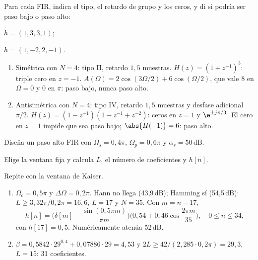 \documentclass[11pt,a4paper]{scrartcl}
\begin{document}
\begin{ejercicio}
  Para cada FIR, indica el tipo, el retardo de grupo y los ceros, y di si podría ser paso bajo o paso alto:
  \begin{incisos}[2]
    \item $h=(1,3,3,1)$;
    \item $h=(1,-2,2,-1)$.
  \end{incisos}
\end{ejercicio}
\begin{solucion}
  \begin{enumerate}[label=\alph*)]
    \item Simétrica con $N=4$: tipo II, retardo $1{,}5$ muestras. $H(z)=(1+z^{-1})^3$: triple cero en $z=-1$. $A(\Omega)=2\cos(3\Omega/2)+6\cos(\Omega/2)$, que vale 8 en $\Omega=0$ y 0 en $\pi$: paso bajo, nunca paso alto.
    \item Antisimétrica con $N=4$: tipo IV, retardo $1{,}5$ muestras y desfase adicional $\pi/2$. $H(z)=(1-z^{-1})(1-z^{-1}+z^{-2})$: ceros en $z=1$ y $\e^{\pm j\pi/3}$. El cero en $z=1$ impide que sea paso bajo; $\abs{H(-1)}=6$: paso alto.
  \end{enumerate}
\end{solucion}

\begin{ejercicio}
  Diseña un paso alto FIR con $\Omega_s=0{,}4\pi$, $\Omega_p=0{,}6\pi$ y $\alpha_s=50$\,dB.
  \begin{incisos}[1]
    \item Elige la ventana fija y calcula $L$, el número de coeficientes y $h[n]$.
    \item Repite con la ventana de Kaiser.
  \end{incisos}
\end{ejercicio}
\begin{solucion}
  \begin{enumerate}[label=\alph*)]
    \item $\Omega_c=0{,}5\pi$ y $\Delta\Omega=0{,}2\pi$. Hann no llega (43,9\,dB); Hamming sí (54,5\,dB): $L\ge3{,}32\pi/0{,}2\pi=16{,}6$, $L=17$ y $N=35$. Con $m=n-17$,
    \[
      h[n]=\Big(\delta[m]-\frac{\sin(0{,}5\pi m)}{\pi m}\Big)\Big(0{,}54+0{,}46\cos\frac{2\pi m}{35}\Big),\quad 0\le n\le34,
    \]
    con $h[17]=0{,}5$. Numéricamente atenúa 52\,dB.
    \item $\beta=0{,}5842\cdot29^{0,4}+0{,}07886\cdot29=4{,}53$ y $2L\ge42/(2{,}285\cdot0{,}2\pi)=29{,}3$, $L=15$: 31 coeficientes.
  \end{enumerate}
\end{solucion}
\end{document}
